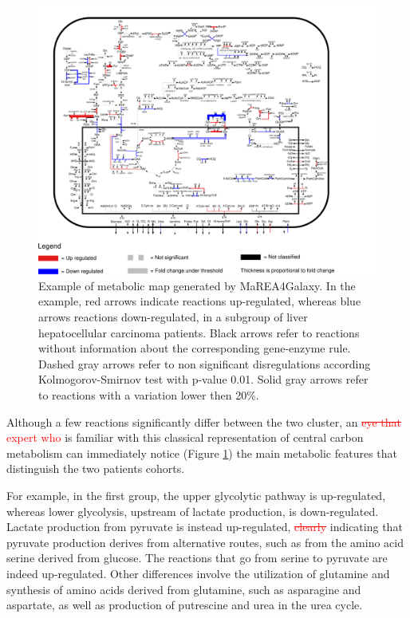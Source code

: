 \documentclass[preprint,12pt,authoryear]{elsarticle}
\newcommand{\red}{\textcolor{red}}
\newcommand{\mareagalaxy}{\textsf{MaREA4Galaxy}}
\begin{document}
\begin{figure}[ht]
  \includegraphics[width=1\textwidth]{figs/map.pdf}
  \caption{Example of metabolic map generated by \mareagalaxy{}. In the
    example, red arrows indicate reactions up-regulated, whereas blue
    arrows reactions down-regulated, in a subgroup of liver
    hepatocellular carcinoma patients. Black arrows refer to reactions
    without information about the corresponding gene-enzyme
    rule. Dashed gray arrows refer to non significant disregulations
    according Kolmogorov-Smirnov test with p-value 0.01. Solid gray
    arrows refer to reactions with a variation lower then 20\%.}
  \label{fig:map}
\end{figure}

Although a few reactions significantly differ between the two cluster,
an \red{\sout{eye that} expert who} is familiar with this classical
representation of central carbon metabolism can immediately notice
(Figure \ref{fig:map}) the main metabolic features that distinguish
the two patients cohorts.

For example, in the first group, the upper glycolytic pathway is
up-regulated, whereas lower glycolysis, upstream of lactate
production, is down-regulated. Lactate production from pyruvate is
instead up-regulated, \red{\sout{clearly}} indicating that pyruvate
production derives from alternative routes, such as from the amino
acid serine derived from glucose. The reactions that go from serine to
pyruvate are indeed up-regulated. Other differences involve the
utilization of glutamine and synthesis of amino acids derived from
glutamine, such as asparagine and aspartate, as well as production of
putrescine and urea in the urea cycle.
\end{document}
